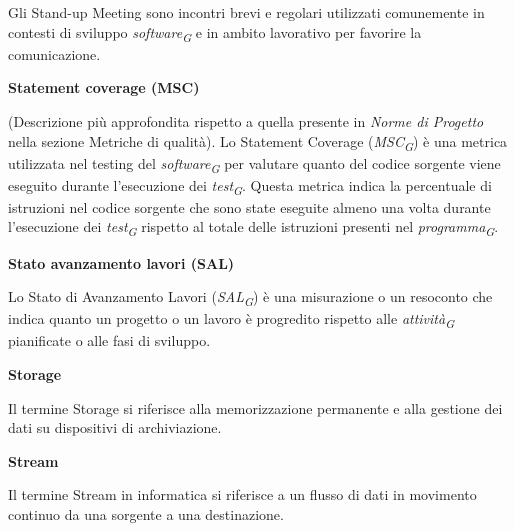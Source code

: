 \documentclass{article}
\begin{document}
Gli Stand-up Meeting sono incontri brevi e regolari utilizzati comunemente in contesti di sviluppo \textit{software}\textsubscript{\textit{G}} e in ambito lavorativo per favorire la comunicazione.

\vspace{0.4cm}

\textbf{Statement coverage (MSC)}

\vspace{0.1cm}

(Descrizione più approfondita rispetto a quella presente in \textit{Norme di Progetto} nella sezione Metriche di qualità). Lo Statement Coverage (\textit{MSC}\textsubscript{\textit{G}}) è una metrica utilizzata nel testing del \textit{software}\textsubscript{\textit{G}} per valutare quanto del codice sorgente viene eseguito durante l'esecuzione dei \textit{test}\textsubscript{\textit{G}}.
Questa metrica indica la percentuale di istruzioni nel codice sorgente che sono state eseguite almeno una volta durante l'esecuzione dei \textit{test}\textsubscript{\textit{G}} rispetto al totale delle istruzioni presenti nel \textit{programma}\textsubscript{\textit{G}}. 

\vspace{0.4cm}

\textbf{Stato avanzamento lavori (SAL)}

\vspace{0.1cm}

Lo Stato di Avanzamento Lavori (\textit{SAL}\textsubscript{\textit{G}}) è una misurazione o un resoconto che indica quanto un progetto o un lavoro è progredito rispetto alle \textit{attività}\textsubscript{\textit{G}} pianificate o alle fasi di sviluppo.

\vspace{0.4cm}

\textbf{Storage}

\vspace{0.1cm}

Il termine Storage si riferisce alla memorizzazione permanente e alla gestione dei dati su dispositivi di archiviazione.

\vspace{0.4cm}

\textbf{Stream}

\vspace{0.1cm}

Il termine Stream in informatica si riferisce a un flusso di dati in movimento continuo da una sorgente a una destinazione.
\end{document}
